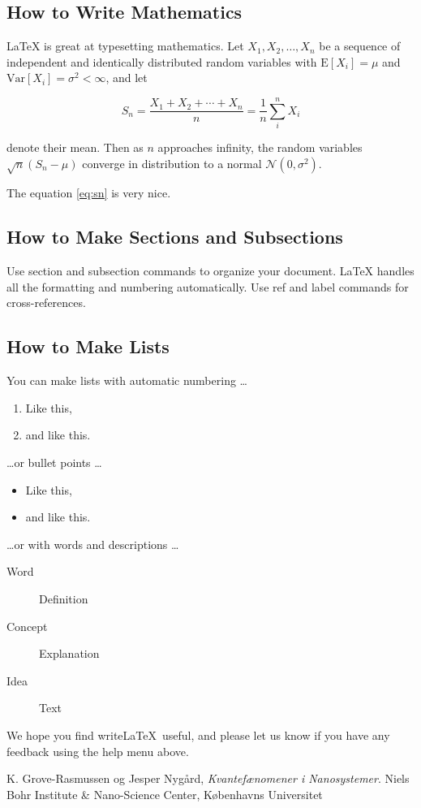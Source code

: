 \documentclass[a4paper]{article}
\begin{document}
\subsection{How to Write Mathematics}

\LaTeX{} is great at typesetting mathematics. Let $X_1, X_2, \ldots, X_n$ be a sequence of independent and identically distributed random variables with $\text{E}[X_i] = \mu$ and $\text{Var}[X_i] = \sigma^2 < \infty$, and let

\begin{equation}
S_n = \frac{X_1 + X_2 + \cdots + X_n}{n}
      = \frac{1}{n}\sum_{i}^{n} X_i
\label{eq:sn}
\end{equation}

denote their mean. Then as $n$ approaches infinity, the random variables $\sqrt{n}(S_n - \mu)$ converge in distribution to a normal $\mathcal{N}(0, \sigma^2)$.

The equation \ref{eq:sn} is very nice.

\subsection{How to Make Sections and Subsections}

Use section and subsection commands to organize your document. \LaTeX{} handles all the formatting and numbering automatically. Use ref and label commands for cross-references.

\subsection{How to Make Lists}

You can make lists with automatic numbering \dots

\begin{enumerate}
\item Like this,
\item and like this.
\end{enumerate}
\dots or bullet points \dots
\begin{itemize}
\item Like this,
\item and like this.
\end{itemize}
\dots or with words and descriptions \dots
\begin{description}
\item[Word] Definition
\item[Concept] Explanation
\item[Idea] Text
\end{description}

We hope you find write\LaTeX\ useful, and please let us know if you have any feedback using the help menu above.


\begin{thebibliography}{9}
  K. Grove-Rasmussen og Jesper Nygård,
  \emph{Kvantefænomener i Nanosystemer}.
  Niels Bohr Institute \& Nano-Science Center, Københavns Universitet

\end{thebibliography}
\end{document}
